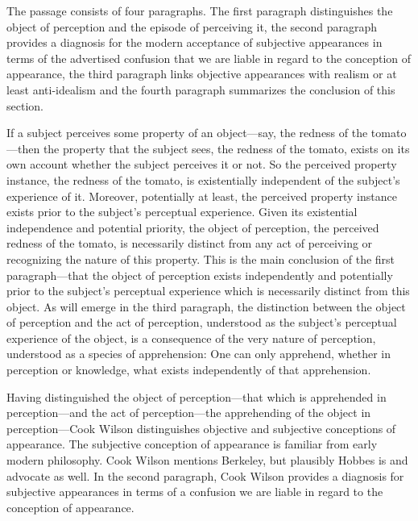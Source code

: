 \documentclass[12pt]{article}
\begin{document}
The passage consists of four paragraphs. The first paragraph distinguishes the object of perception and the episode of perceiving it, the second paragraph provides a diagnosis for the modern acceptance of subjective appearances in terms of the advertised confusion that we are liable in regard to the conception of appearance, the third paragraph links objective appearances with realism or at least anti-idealism and the fourth paragraph summarizes the conclusion of this section.

If a subject perceives some property of an object---say, the redness of the tomato ---then the property that the subject sees, the redness of the tomato, exists on its own account whether the subject perceives it or not. So the perceived property instance, the redness of the tomato, is existentially independent of the subject's experience of it. Moreover, potentially at least, the perceived property instance exists prior to the subject's perceptual experience. Given its existential independence and potential priority, the object of perception, the perceived redness of the tomato, is necessarily distinct from any act of perceiving or recognizing the nature of this property. This is the main conclusion of the first paragraph---that the object of perception exists independently and potentially prior to the subject's perceptual experience which is necessarily distinct from this object. As will emerge in the third paragraph, the distinction between the object of perception and the act of perception, understood as the subject's perceptual experience of the object, is a consequence of the very nature of perception, understood as a species of apprehension: One can only apprehend, whether in perception or knowledge, what exists independently of that apprehension.

Having distinguished the object of perception---that which is apprehended in perception---and the act of per\-cep\-tion\----the apprehending of the object in per\-cep\-tion\----Cook Wilson distinguishes objective and subjective conceptions of appearance. The subjective conception of appearance is familiar from early modern philosophy. Cook Wilson mentions Berkeley, but plausibly Hobbes is and advocate as well. In the second paragraph, Cook Wilson provides a diagnosis for subjective appearances in terms of a confusion we are liable in regard to the conception of appearance. 
\end{document}

